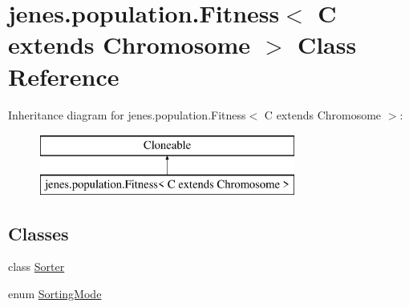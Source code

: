 \hypertarget{classjenes_1_1population_1_1_fitness_3_01_c_01extends_01_chromosome_01_4}{\section{jenes.\-population.\-Fitness$<$ C extends Chromosome $>$ Class Reference}
\label{classjenes_1_1population_1_1_fitness_3_01_c_01extends_01_chromosome_01_4}
}
Inheritance diagram for jenes.\-population.\-Fitness$<$ C extends Chromosome $>$\-:\begin{figure}[H]
\begin{center}
\leavevmode
\includegraphics[height=2.000000cm]{classjenes_1_1population_1_1_fitness_3_01_c_01extends_01_chromosome_01_4}
\end{center}
\end{figure}
\subsection*{Classes}
\begin{DoxyCompactItemize}
\item 
class \hyperlink{classjenes_1_1population_1_1_fitness_3_01_c_01extends_01_chromosome_01_4_1_1_sorter}{Sorter}
\item 
enum \hyperlink{enumjenes_1_1population_1_1_fitness_3_01_c_01extends_01_chromosome_01_4_1_1_sorting_mode}{Sorting\-Mode}
\end{DoxyCompactItemize}
